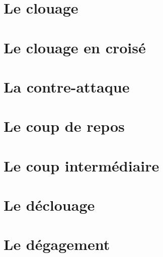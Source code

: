 \documentclass[a5paper,openany,twocolumn]{book}
\begin{document}
{\chapter{Le clouage}

\lipsum[4]

\chapter{Le clouage en croisé}

\lipsum[4]

\chapter{La contre-attaque}

\lipsum[4]

\chapter{Le coup de repos}

\lipsum[4]

\chapter{Le coup intermédiaire}

\lipsum[4]

\chapter{Le déclouage}

\lipsum[4]

\chapter{Le dégagement}

}
\end{document}
